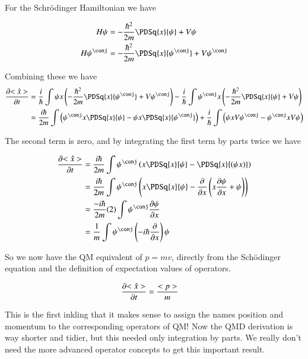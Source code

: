 For the Schr\"{o}dinger Hamiltonian we have

\begin{align*}
H \psi &= - \frac{\hbar^2}{2m} \PDSq{x}{\psi} + V\psi \\
H \psi^\conj &= - \frac{\hbar^2}{2m} \PDSq{x}{\psi^\conj} + V\psi^\conj \\
\end{align*}

Combining these we have
\begin{align*}
\PD{t}{<\hat{x}>}
&= 
\frac{i}{\hbar} \int \psi x \left( - \frac{\hbar^2}{2m} \PDSq{x}{\psi^\conj} + V\psi^\conj \right) 
-\frac{i}{\hbar} \int \psi^\conj x \left(- \frac{\hbar^2}{2m} \PDSq{x}{\psi} + V\psi \right) \\
&= 
\frac{i\hbar}{2m} \int \left(\psi^\conj x \PDSq{x}{\psi} -\psi x \PDSq{x}{\psi^\conj} \right)
+\frac{i}{\hbar} \int \left(\psi x V\psi^\conj -\psi^\conj x V\psi \right) 
\\
\end{align*}

The second term is zero, and by integrating the first term by parts twice we have

\begin{align*}
\PD{t}{<\hat{x}>}
&= \frac{i\hbar}{2m} \int \psi^\conj \left(x \PDSq{x}{\psi} - \PDSq{x}{(\psi x)} \right) \\
&= \frac{i\hbar}{2m} \int \psi^\conj \left(x \PDSq{x}{\psi} - \PD{x}{}\left(x \PD{x}{\psi} + \psi\right) \right) \\
&= \frac{-i\hbar}{2m} (2) \int \psi^\conj \PD{x}{\psi} \\
&= \frac{1}{m} \int \psi^\conj \left(-i\hbar \PD{x}{} \right) {\psi} \\
\end{align*}

So we now have the QM equivalent of $p = mv$, directly from the Sch\"{o}dinger equation and the definition of expectation values
of operators.

\begin{align}
\PD{t}{<\hat{x}>} &= \frac{<p>}{m} 
\end{align}

This is the first inkling that it makes sense to assign the names position and momentum to the corresponding operators
of QM!  Now the QMD derivation is way shorter and tidier, but this needed only integration by parts.  We really don't
need the more advanced operator concepts to get this important result.  

